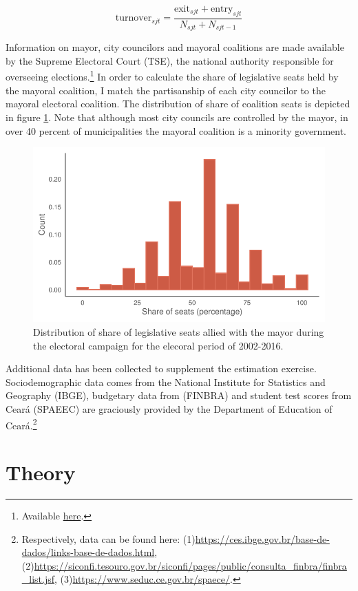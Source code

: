 \documentclass[12pt,a4paper]{article}
\begin{document}
$$\text{turnover}_{sjt} = \frac{\text{exit}_{sjt} + \text{entry}_{sjt}}{N_{sjt} + N_{sjt-1}}$$

Information on mayor, city councilors and mayoral coalitions are made available by the Supreme Electoral Court (TSE), the national authority responsible for overseeing elections.\footnote{Available \hyperlink{http://www.tse.jus.br/eleicoes/estatisticas/repositorio-de-dados-eleitorais-1}{here}.} In order to calculate the share of legislative seats held by the mayoral coalition, I match the partisanship of each city councilor to the mayoral electoral coalition. The distribution of share of coalition seats is depicted in figure \ref{fig:hist_coalition}. Note that although most city councils are controlled by the mayor, in over 40 percent of municipalities the mayoral coalition is a minority government.

\begin{figure}
    \centering
    \includegraphics[width=0.6\linewidth]{plots/hist_coalition.pdf}
    \caption{Distribution of share of legislative seats allied with the mayor during the electoral campaign for the elecoral period of 2002-2016.}
    \label{fig:hist_coalition}
\end{figure}

Additional data has been collected to supplement the estimation exercise. Sociodemographic data comes from the National Institute for Statistics and Geography (IBGE), budgetary data from (FINBRA) and student test scores from Ceará (SPAEEC) are graciously provided by the Department of Education of Ceará.\footnote{Respectively, data can be found here: (1)\url{https://ces.ibge.gov.br/base-de-dados/links-base-de-dados.html}, (2)\url{https://siconfi.tesouro.gov.br/siconfi/pages/public/consulta_finbra/finbra_list.jsf}, (3)\url{https://www.seduc.ce.gov.br/spaece/}.}

\section{Theory}
\label{sec:theory}
\end{document}
